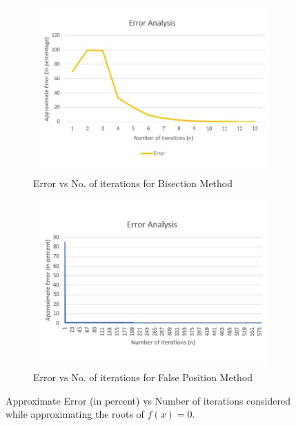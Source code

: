 \documentclass[titlepage, 11pt]{article}
\begin{document}
\begin{figure}[ht]
\begin{subfigure}{.5\textwidth}
  \centering
  \includegraphics[width=\linewidth]{Error4a.pdf}
  \caption{Error vs No. of iterations for Bisection Method}
  \label{fig:fig9a}
\end{subfigure}
\begin{subfigure}{.5\textwidth}
  \centering
  \includegraphics[width=\linewidth]{Approx.pdf}
  \caption{Error vs No. of iterations for False Position Method}
  \label{fig:fig9b}
\end{subfigure}
\caption{Approximate Error (in percent) vs Number of iterations considered while approximating the roots of $f(x)=0$.}
\label{fig:q4}
\end{figure}
\end{document}

